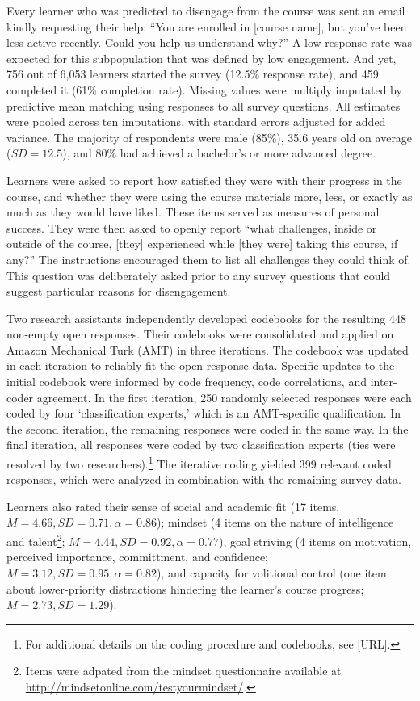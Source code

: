 \documentclass{sigchi}\usepackage[]{graphicx}\usepackage[]{color}
\begin{document}
Every learner who was predicted to disengage from the course was sent an email kindly requesting their help: ``You are enrolled in [course name], but you've been less active recently. Could you help us understand why?'' A low response rate was expected for this subpopulation that was defined by low engagement. And yet, 756 out of 6,053 learners started the survey (12.5\% response rate), and 459 completed it (61\% completion rate). Missing values were multiply imputated by predictive mean matching using responses to all survey questions. All estimates were pooled across ten imputations, with standard errors adjusted for added variance. The majority of respondents were male (85\%), 35.6 years old on average ($SD=12.5$), and 80\% had achieved a bachelor's or more advanced degree.

Learners were asked to report how satisfied they were with their progress in the course, and whether they were using the course materials more, less, or exactly as much as they would have liked. These items served as measures of personal success. They were then asked to openly report ``what challenges, inside or outside of the course, [they] experienced while [they were] taking this course, if any?'' The instructions encouraged them to list all challenges they could think of. This question was deliberately asked prior to any survey questions that could suggest particular reasons for disengagement.

Two research assistants independently developed codebooks for the resulting 448 non-empty open responses. Their codebooks were consolidated and applied on Amazon Mechanical Turk (AMT) in three iterations. The codebook was updated in each iteration to reliably fit the open response data. Specific updates to the initial codebook were informed by code frequency, code correlations, and inter-coder agreement. In the first iteration, 250 randomly selected responses were each coded by four `classification experts,' which is an AMT-specific qualification. In the second iteration, the remaining responses were coded in the same way. In the final iteration, all responses were coded by two classification experts (ties were resolved by two researchers).\footnote{For additional details on the coding procedure and codebooks, see [URL].} The iterative coding yielded 399 relevant coded responses, which were analyzed in combination with the remaining survey data.

Learners also rated their sense of social and academic fit \cite{walton2007question} (17 items, $M=4.66, SD=0.71, \alpha=0.86$); mindset (4 items on the nature of intelligence and talent\footnote{Items were adpated from the mindset questionnaire available at \url{http://mindsetonline.com/testyourmindset/}.}; $M=4.44, SD=0.92, \alpha=0.77$), goal striving (4 items on motivation, perceived importance, committment, and confidence; $M=3.12, SD=0.95, \alpha=0.82$), and capacity for volitional control (one item about lower-priority distractions hindering the learner's course progress; $M=2.73, SD=1.29$).
\end{document}
